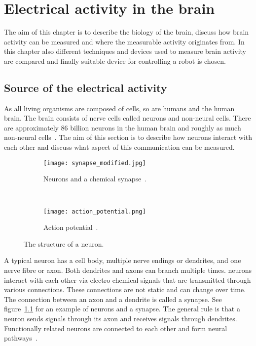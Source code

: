 
\chapter{Electrical activity in the brain}

The aim of this chapter is to describe the biology of the brain, discuss how brain activity can be measured and where the measurable activity originates from. In this chapter also different techniques and devices used to measure brain activity are compared and finally suitable device for controlling a robot is chosen.

\section{Source of the electrical activity}
\label{sec:neuron}

As all living organisms are composed of cells, so are humans and the human brain. The brain consists of nerve cells called \glspl{neuron} and non-neural cells. There are approximately 86 billion \glspl{neuron} in the human brain and roughly as much non-neural cells~\cite{neuroncount}. The aim of this section is to describe how \glspl{neuron} interact with each other and discuss what aspect of this communication can be measured.

\begin{figure}[b!]
	\centering
	\begin{subfigure}[b]{0.48\textwidth}
		\texttt{[image: synapse\_modified.jpg]}
		\caption{Neurons and a chemical synapse~\cite[p.~17]{neuronpic}.}
		\label{fig:neuron_synapse}
	\end{subfigure}
	~
	\begin{subfigure}[b]{0.48\textwidth}
		\texttt{[image: action\_potential.png]}
		\caption{Action potential~\cite{action_potential_pic}.}
		\label{fig:action_potential}
	\end{subfigure}
	\caption{The structure of a neuron.}
\end{figure}

A typical \gls{neuron} has a cell body, multiple nerve endings or \glspl{dendrite}, and one nerve fibre or \gls{axon}. Both \glspl{dendrite} and \glspl{axon} can branch multiple times. \Glspl{neuron} interact with each other via electro-chemical signals that are transmitted through various connections. These connections are not static and can change over time. The connection between an \gls{axon} and a \gls{dendrite} is called a \gls{synapse}. See figure~\ref{fig:neuron_synapse} for an example of \glspl{neuron} and a \gls{synapse}. The general rule is that a \gls{neuron} sends signals through its \gls{axon} and receives signals through \glspl{dendrite}. Functionally related \glspl{neuron} are connected to each other and form \glspl{neural pathway}~\cite{neuralpathway}.

